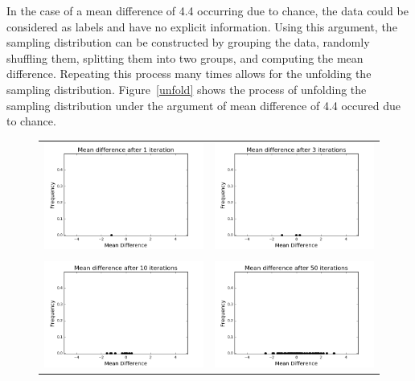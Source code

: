 In the case of a mean difference of 4.4 occurring due to chance, the data could be considered as labels and have no explicit information. Using this argument, the sampling distribution can be constructed by grouping the data, randomly shuffling them, splitting them into two groups, and computing the mean difference. Repeating this process many times allows for the unfolding  the sampling distribution. Figure~\ref{unfold} shows the process of unfolding the sampling distribution under the argument of mean difference of 4.4 occured due to chance.
\begin{figure}
  \centering
  \begin{tabular}{cc}
    \includegraphics[width=8cm]{./figures/testp0} & \includegraphics[width=8cm]{./figures/testp1} \\
     & \\
    \includegraphics[width=8cm]{./figures/testp2} & \includegraphics[width=8cm]{./figures/testp3} \\

\end{tabular}
\end{figure}
